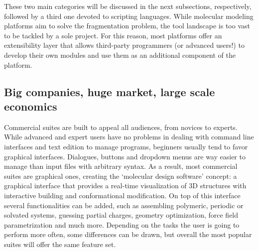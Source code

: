 These two main categories will be discussed in the next subsections, respectively, followed by a third one devoted to scripting languages. While molecular modeling platforms aim to solve the fragmentation problem, the tool landscape is too vast to be tackled by a sole project. For this reason, most platforms offer an extensibility layer that allows third-party programmers (or advanced users!) to develop their own modules and use them as an additional component of the platform.

\subsection{Big companies, huge market, large scale economics}
Commercial suites are built to appeal all audiences, from novices to experts. While advanced and expert users have no problems in dealing with command line interfaces and text edition to manage programs, beginners usually tend to favor graphical interfaces. Dialogues, buttons and dropdown menus are way easier to manage than input files with arbitrary syntax. As a result, most commercial suites are graphical ones, creating the ‘molecular design software’ concept: a graphical interface that provides a real-time visualization of 3D structures with interactive building and conformational modification. On top of this interface several functionalities can be added, such as assembling polymeric, periodic or solvated systems, guessing partial charges, geometry optimization, force field parametrization and much more. Depending on the tasks the user is going to perform more often, some differences can be drawn, but overall the most popular suites will offer the same feature set.

